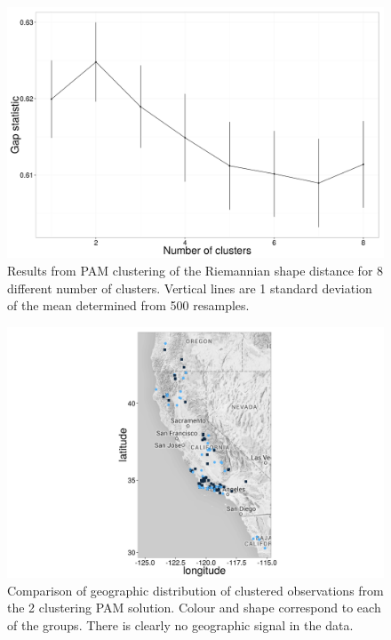 \documentclass[12pt,letterpaper]{article}
\begin{document}
\begin{figure}[h]
  \centering
  \includegraphics[height = 0.5\textheight, width = \textwidth, keepaspectratio = true]{figure/gap_res}
  \caption{Results from PAM clustering of the Riemannian shape distance for 8 different number of clusters. Vertical lines are 1 standard deviation of the mean determined from 500 resamples.}
  \label{fig:gap}
\end{figure}

\begin{figure}[h]
  \centering
  \includegraphics[height = 0.5\textheight, width = \textwidth, keepaspectratio = true]{figure/gap_map}
  \caption{Comparison of geographic distribution of clustered observations from the 2 clustering PAM solution. Colour and shape correspond to each of the groups. There is clearly no geographic signal in the data.}
  \label{fig:gap_map}
\end{figure}
\end{document}
